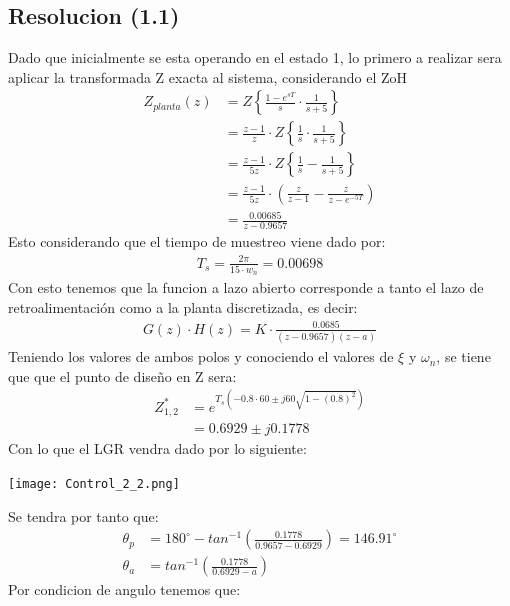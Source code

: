 \documentclass[
  11pt,
  letterpaper,
   addpoints,
   answers
  ]{exam}
\begin{document}
\begin{questions}
\begin{solution}
    \subsection*{Resolucion (1.1)}
    Dado que inicialmente se esta operando en el estado 1, lo primero a realizar sera aplicar la transformada Z exacta al sistema, considerando el ZoH
    \begin{align}
        Z_{planta}(z) &= Z\left\{\frac{1-e^{sT}}{s} \cdot \frac{1}{s+5}\right\} \\
        &= \frac{z-1}{z} \cdot Z\left\{\frac{1}{s} \cdot \frac{1}{s+5}\right\}\\
        &= \frac{z-1}{5z} \cdot Z\left\{ \frac{1}{s} - \frac{1}{s+5}\right\}\\
        &= \frac{z-1}{5z} \cdot \left( \frac{z}{z-1} - \frac{z}{z-e^{-5T}}\right)\\
        &= \frac{0.00685}{z-0.9657}
    \end{align}    
    Esto considerando que el tiempo de muestreo viene dado por:
    \begin{align}
        T_{s} = \frac{2\pi}{15\cdot w_{n}} = 0.00698
    \end{align}
    Con esto tenemos que la funcion a lazo abierto corresponde a tanto el lazo de retroalimentación como a la planta discretizada, es decir:
    \begin{align}
        G(z) \cdot H(z) = K \cdot \frac{0.0685}{(z-0.9657)(z-a)}
    \end{align}
    Teniendo los valores de ambos polos y conociendo el valores de $\xi$ y $\omega_{n}$, se tiene que que el punto de diseño en Z sera:
    \begin{align}
        Z_{1,2}^{*} &= e^{T_{s}(- 0.8 \cdot 60 \pm j60 \sqrt{1-(0.8)^{2}})}\\
        &= 0.6929 \pm j0.1778
    \end{align}
    Con lo que el LGR vendra dado por lo siguiente:
    \begin{center}
        \texttt{[image: Control\_2\_2.png]}
    \end{center}
    Se tendra por tanto que:
    \begin{align}
        \theta_{p} &= 180^{\circ} - tan^{-1}\left( \frac{0.1778}{0.9657-0.6929}\right)=146.91^{\circ}\\
        \theta_{a} &= tan^{-1}\left(\frac{0.1778}{0.6929-a}\right)
    \end{align}
    Por condicion de angulo tenemos que:

\end{solution}
\end{questions}
\end{document}
